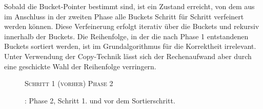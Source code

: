Sobald die Bucket-Pointer bestimmt sind, ist ein Zustand erreicht, von dem aus im Anschluss in der zweiten Phase alle Buckets Schritt für Schritt verfeinert werden können. Diese Verfeinerung erfolgt iterativ über die Buckets und rekursiv innerhalb der Buckets. Die Reihenfolge, in der die nach Phase 1 entstandenen Buckets sortiert werden, ist im Grundalgorithmus für die Korrektheit irrelevant. Unter Verwendung der Copy-Technik lässt sich der Rechenaufwand aber durch eine geschickte Wahl der Reihenfolge verringern.\par
\begin{figure}[H]
    {\centering\begin{minipage}{\textwidth}
        {\large \textsc{Schritt 1 (vorher)}} \hfill {\Large \textsc{Phase 2}}\par\medskip
    \end{minipage}}
    \caption[\bpr: Phase 2, Schritt 1 (vorher)]{\bpr: Phase 2, Schritt 1. \sa und \bptr vor dem Sortierschritt.}
    \label{bpr:p2s1:1}
\end{figure}
